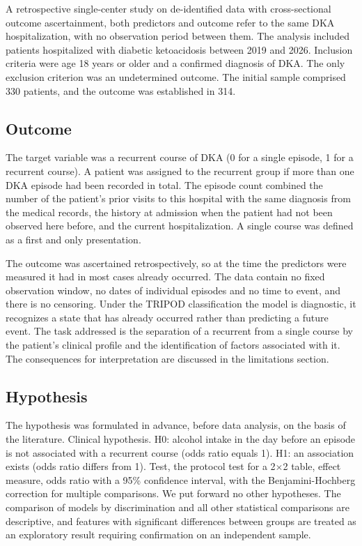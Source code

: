 \documentclass[pdflatex,sn-basic,Numbered]{sn-jnl}
\begin{document}
A retrospective single-center study on de-identified data with cross-sectional outcome ascertainment, both predictors and outcome refer to the same DKA hospitalization, with no observation period between them. The analysis included patients hospitalized with diabetic ketoacidosis between 2019 and 2026. Inclusion criteria were age 18 years or older and a confirmed diagnosis of DKA. The only exclusion criterion was an undetermined outcome. The initial sample comprised 330 patients, and the outcome was established in 314.

\subsection{Outcome}\label{subsec2_2}

The target variable was a recurrent course of DKA (0 for a single episode, 1 for a recurrent course). A patient was assigned to the recurrent group if more than one DKA episode had been recorded in total. The episode count combined the number of the patient's prior visits to this hospital with the same diagnosis from the medical records, the history at admission when the patient had not been observed here before, and the current hospitalization. A single course was defined as a first and only presentation.

The outcome was ascertained retrospectively, so at the time the predictors were measured it had in most cases already occurred. The data contain no fixed observation window, no dates of individual episodes and no time to event, and there is no censoring. Under the TRIPOD classification the model is diagnostic, it recognizes a state that has already occurred rather than predicting a future event. The task addressed is the separation of a recurrent from a single course by the patient's clinical profile and the identification of factors associated with it. The consequences for interpretation are discussed in the limitations section.

\subsection{Hypothesis}\label{subsec2_3}

The hypothesis was formulated in advance, before data analysis, on the basis of the literature. Clinical hypothesis. H0: alcohol intake in the day before an episode is not associated with a recurrent course (odds ratio equals 1). H1: an association exists (odds ratio differs from 1). Test, the protocol test for a 2$\times$2 table, effect measure, odds ratio with a 95\% confidence interval, with the Benjamini-Hochberg correction for multiple comparisons. We put forward no other hypotheses. The comparison of models by discrimination and all other statistical comparisons are descriptive, and features with significant differences between groups are treated as an exploratory result requiring confirmation on an independent sample.
\end{document}

